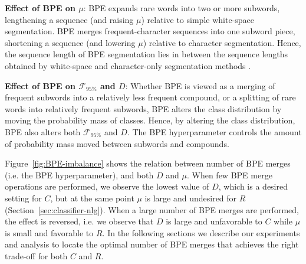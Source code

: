 \textbf{Effect of BPE on $\mu$}:
BPE expands rare words into two or more subwords, lengthening a sequence (and raising $\mu$) relative to simple white-space segmentation.
BPE merges frequent-character sequences into one subword piece, shortening a sequence (and lowering $\mu$) relative to character segmentation.
Hence, the sequence length of BPE segmentation lies in between the sequence lengths obtained by white-space and character-only segmentation methods \cite{morishita-etal-2018-improving}. %

\textbf{Effect of BPE on $\mathcal{F}_{95\%}$ and $D$}:
Whether BPE is viewed as a merging of frequent subwords into a relatively less frequent compound, or a splitting of rare words into relatively frequent subwords, BPE alters the class distribution by moving the probability mass of classes.
Hence, by altering the class distribution, BPE also alters both $\mathcal{F}_{95\%}$ and $D$. The BPE hyperparameter controls the amount of probability mass moved between subwords and compounds.

Figure~\ref{fig:BPE-imbalance} shows the relation between number of BPE merges (i.e. the BPE hyperparameter), and both $D$ and $\mu$.
When few BPE merge operations are performed, we observe the lowest value of $D$, which is a desired setting for $C$, but at the same point $\mu$ is large and undesired for $R$ (Section~\ref{sec:classifier-nlg}).
When a large number of BPE merges are performed, the effect is reversed, i.e. we observe that $D$ is large and unfavorable to $C$ while $\mu$ is small and favorable to $R$.
In the following sections we describe our experiments and analysis to locate the optimal number of BPE merges that achieves the right trade-off for both $C$ and $R$.


